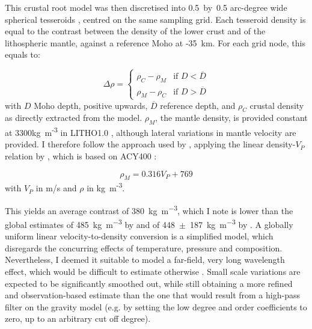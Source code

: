 This crustal root model was then discretised into {0.5}~by~{0.5} arc-degree wide spherical tesseroids \parencite{Uieda2016}, centred on the same sampling grid.
Each tesseroid density is equal to the contrast between the density of the lower crust and of the lithospheric mantle, against a reference Moho at {-35}~\si{\kilo \metre}.
For each grid node, this equals to:

\begin{equation}
	\label{eq:RhoContrast}
	\Delta \rho = \begin{cases}
		\rho_{C} - \rho_{M} & \mbox{if } D < \overline{D} \\ 
	    \rho_{M} - \rho_{C} & \mbox{if } D > \overline{D}
    \end{cases}
\end{equation}
with $D$ Moho depth, positive upwards, $\overline{D}$ reference depth, and $\rho_{C}$ crustal density as directly extracted from the model.
$\rho_{M}$, the mantle density, is provided constant at 3300{kg~m\textsuperscript{-3}} in {LITHO1.0} \parencite{Pasyanos2014}, although lateral variations in mantle velocity are provided.
I therefore follow the approach used by \textcite{Sebera2018}, applying the linear density-$V_P$ relation by \textcite{Yegorova2015}, which is based on {ACY400} \parencite{Montagner1989}:

\begin{equation}
	\label{eq:ACY400}
	\rho_M = 0.316 V_P + 769
\end{equation}
with $V_P$ in m/s and $\rho$ in {kg~m\textsuperscript{-3}}.

This yields an average contrast of 380~\si{\kilo \gram \per \cubic \metre}, which I note is lower than the global estimates of 485~\si{\kilo \gram \per \cubic \metre} by \textcite{Tenzer2012contrast} and of 448~$\pm$~187~\si{\kilo \gram \per \cubic \metre} by \textcite{Sjoberg2011}.
A globally uniform linear velocity-to-density conversion is a simplified model, which disregards the concurring effects of temperature, pressure and composition.
Nevertheless, I deemed it suitable to model a far-field, very long wavelength effect, which would be difficult to estimate otherwise \parencite[for a different approach, based on topography and the Airy-Heiskanen isostatic model, see][]{Grombein2016}.
Small scale variations are expected to be significantly smoothed out, while still obtaining a more refined and observation-based estimate than the one that would result from a high-pass filter on the gravity model (e.g. by setting the low degree and order coefficients to zero, up to an arbitrary cut off degree).


